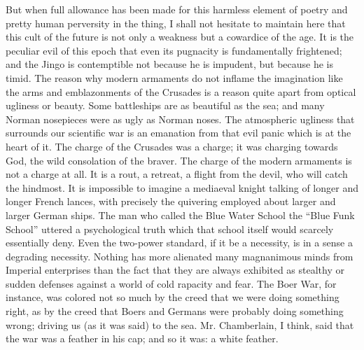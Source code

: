 \documentclass{book}
\begin{document}
But when full allowance has been made for this harmless element of poetry and pretty human perversity in the thing, I shall not hesitate to maintain here that this cult of the future is not only a weakness but a cowardice of the age. It is the peculiar evil of this epoch that even its pugnacity is fundamentally frightened; and the Jingo is contemptible not because he is impudent, but because he is timid. The reason why modern armaments do not inflame the imagination like the arms and emblazonments of the Crusades is a reason quite apart from optical ugliness or beauty. Some battleships are as beautiful as the sea; and many Norman nosepieces were as ugly as Norman noses. The atmospheric ugliness that surrounds our scientific war is an emanation from that evil panic which is at the heart of it. The charge of the Crusades was a charge; it was charging towards God, the wild consolation of the braver. The charge of the modern armaments is not a charge at all. It is a rout, a retreat, a flight from the devil, who will catch the hindmost. It is impossible to imagine a mediaeval knight talking of longer and longer French lances, with precisely the quivering employed about larger and larger German ships. The man who called the Blue Water School the “Blue Funk School” uttered a psychological truth which that school itself would scarcely essentially deny. Even the two-power standard, if it be a necessity, is in a sense a degrading necessity. Nothing has more alienated many magnanimous minds from Imperial enterprises than the fact that they are always exhibited as stealthy or sudden defenses against a world of cold rapacity and fear. The Boer War, for instance, was colored not so much by the creed that we were doing something right, as by the creed that Boers and Germans were probably doing something wrong; driving us (as it was said) to the sea. Mr. Chamberlain, I think, said that the war was a feather in his cap; and so it was: a white feather.
\end{document}
